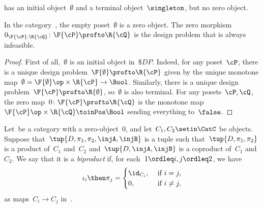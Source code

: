 \begin{example}
    \Pos has an initial object~$\emptyset$ and a terminal object~$\singleton$, but no zero object.
\end{example}

\begin{lemma}
    In the category~\DP, the empty poset~$\emptyset$ is a zero object.
    The zero morphism~$0_{\F{\cP},\R{\cQ}}\colon \F{\cP} \profto \R{\cQ}$ is the design problem that is always infeasible.
\end{lemma}
\begin{proof}
    First of all,~$\emptyset$ is an initial object in~$\$DP$.
    Indeed, for any poset~$\cP $, there is a unique design problem~$\F{\emptyset} \profto \R{\cP}$ given by the unique monotone map~$\emptyset=\F{\emptyset}\op\times \R{\cP} \to\Bool$.
    Similarly, there is a unique design problem~$\F{\cP} \profto \R{\emptyset}$, so~$\emptyset$ is also terminal.
    For any posets~$\cP ,\cQ$, the zero map~$0 \colon \F{\cP} \profto \R{\cQ}$ is the monotone map~$\F{\cP} \op\times \R{\cQ} \toinPos \Bool$ sending everything to~$\false$.
\end{proof}

\begin{ctdefinition}[Biproduct]
    \label{def:biproduct}
    Let~\CatC be a category with a zero-object~$0$, and let~$C_1,C_2\setin\CatC$ be objects.
    Suppose that~$\tup{D,\pi_1,\pi_2,\injA,\injB}$ is a tuple such that~$\tup{D,\pi_1,\pi_2}$ is a product of~$C_1$ and~$C_2$ and~$\tup{D,\injA,\injB}$ is a coproduct of~$C_1$ and~$C_2$.
    We say that it is a \emph{biproduct} if, for each~$1\ordleq i,j\ordleq 2$, we have
    \begin{equation}
        \iota_i\then \pi_j=
        \begin{cases}
            \id_{C_i}, & \text{ if }i=j,     \\
            0,         & \text{ if }i\neq j,
        \end{cases} \label{eq:biproduct-condition}
    \end{equation}
    as maps~$C_i\to C_j$ in~\CatC.
\end{ctdefinition}

